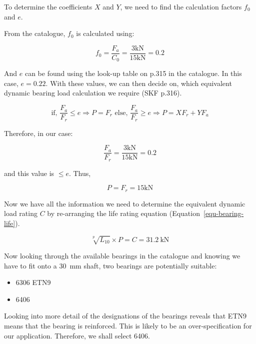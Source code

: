 To determine the coefficients \(X\) and \(Y\), we need to find the calculation factors \(f_0\) and \(e\).

From the catalogue, \(f_0\) is calculated using:

\begin{equation}
  f_0 = \frac{F_a}{C_0} = \frac{3\si{\kilo\newton}}{15\si{\kilo\newton}} = 0.2
\end{equation}

And \(e\) can be found using the look-up table on p.315 in the catalogue. In this case, \(e=0.22\). With these values, we can then decide on, which equivalent dynamic bearing load calculation we require (SKF p.316). 

\begin{equation}
 \text{if, }\frac{F_a}{F_r}\le e \Rightarrow P=F_r \text{ else, } \frac{F_a}{F_r}\ge e \Rightarrow P=XF_r+YF_a
\end{equation}

Therefore, in our case:

\begin{equation}
  \frac{F_a}{F_r}=\frac{3\si{\kilo\newton}}{15\si{\kilo\newton}}=0.2
\end{equation}

\noindent{} and this value is \(\le e\). Thus, 

\begin{equation}
  P=F_r=15\si{\kilo\newton}
\end{equation}

Now we have all the information we need to determine the equivalent dynamic load rating \(C\) by re-arranging the life rating equation (Equation~\ref{equ-bearing-life}). 

\begin{equation}
  \sqrt[p]{L_{10}}\times P = C = \SI{31.2}{\kilo\newton}
\end{equation}

Now looking through the available bearings in the catalogue and knowing we have to fit onto a \SI{30}{\milli\metre} shaft, two bearings are potentially suitable:

\begin{itemize}
  \item 6306 ETN9
  \item 6406
\end{itemize}

Looking into more detail of the designations of the bearings reveals that ETN9 means that the bearing is reinforced. This is likely to be an over-specification for our application. Therefore, we shall select 6406.

